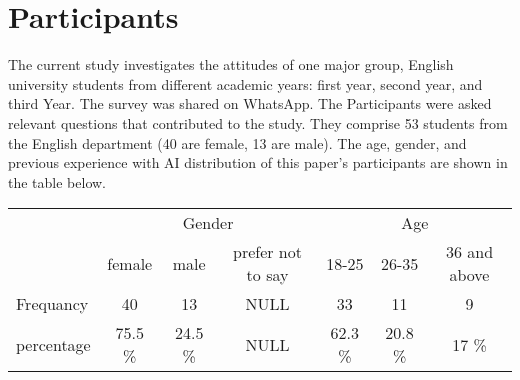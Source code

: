 \section{Participants}
The current study investigates the attitudes of one major group, English university students
from different academic years: first year, second year, and third Year. The survey was
shared on WhatsApp. The Participants were asked relevant questions that contributed to the study.
They comprise 53 students from the English department (40 are female, 13 are male).
The age, gender, and previous experience with AI distribution of this paper’s
participants are shown in the table below.

\begin{table}[H]
	\begin{tabular}{l|ccc|ccc|}
		\cline{2-7}
		\multirow{2}{*}{}                & \multicolumn{3}{c|}{Gender}  & \multicolumn{3}{c|}{Age}                                                                                                                                                \\ \cline{2-7}
		                                 & \multicolumn{1}{c|}{female}  & \multicolumn{1}{c|}{male}    & \multicolumn{1}{c|}{prefer not to say} & \multicolumn{1}{c|}{18-25}   & \multicolumn{1}{c|}{26-35}   & \multicolumn{1}{c|}{36 and above} \\ \hline
		\multicolumn{1}{|l|}{Frequancy}  & \multicolumn{1}{c|}{40}      & \multicolumn{1}{c|}{13}      & \multicolumn{1}{c|}{NULL}              & \multicolumn{1}{c|}{33}      & \multicolumn{1}{c|}{11}      & \multicolumn{1}{c|}{9}            \\ \hline
		\multicolumn{1}{|l|}{percentage} & \multicolumn{1}{c|}{75.5 \%} & \multicolumn{1}{c|}{24.5 \%} & \multicolumn{1}{c|}{NULL}              & \multicolumn{1}{c|}{62.3 \%} & \multicolumn{1}{c|}{20.8 \%} & \multicolumn{1}{c|}{17 \%}        \\ \hline
	\end{tabular}
\end{table}
